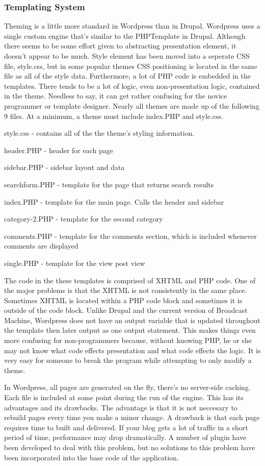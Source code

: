 \documentclass[a4paper,12pt]{report}
\begin{document}
\subsubsection{Templating System}
Theming is a little more standard in Wordpress than in Drupal. 
Wordpress uses a single custom engine that's similar to the PHPTemplate in Drupal. 
Although there seems to be some effort given to abstracting presentation element, it doesn't appear to be much. Style element has been moved into a seperate CSS file, style.css, but in some popular themes CSS positioning is located in the same file as all of the style data.
Furthermore, a lot of PHP code is embedded in the templates. 
There tends to be a lot of logic, even non-presentation logic, contained in the theme. Needless to say, it can get rather confusing for the novice programmer or template designer. 
Nearly all themes are made up of the following 9 files. At a minimum, a theme must include index.PHP and style.css. 

style.css - contains all of the the theme's styling information.

header.PHP - header for each page

sidebar.PHP - sidebar layout and data

searchform.PHP - template for the page that returns search results

index.PHP - template for the main page. Calls the header and sidebar

category-2.PHP - template for the second category

comments.PHP - template for the comments section, which is included whenever comments are displayed

single.PHP - template for the view post view


The code in the these templates is comprised of XHTML and PHP code. 
One of the major problems is that the XHTML is not consistently in the same place. 
Sometimes XHTML is located within a PHP code block and sometimes it is outside of the code block. 
Unlike Drupal and the current version of Broadcast Machine, Wordpress does not have an output variable that is updated throughout the template then later output as one output statement. 
This makes things even more confusing for non-programmers because, without knowing PHP, he or she may not know what code effects presentation and what code effects the logic. 
It is very easy for someone to break the program while attempting to only modify a theme. 


In Wordpress, all pages are generated on the fly, there's no server-side caching. 
Each file is included at some point during the run of the engine. 
This has its advantages and its drawbacks. 
The advantage is that it is not neccesary to rebuild pages every time you make a minor change. 
A drawback is that each page requires time to built and delivered. 
If your blog gets a lot of traffic in a short period of time, performance may drop dramatically. 
A number of plugin have been developed to deal with this problem, but no solutions to this problem have been incorporated into the base code of the application. 
\end{document}
